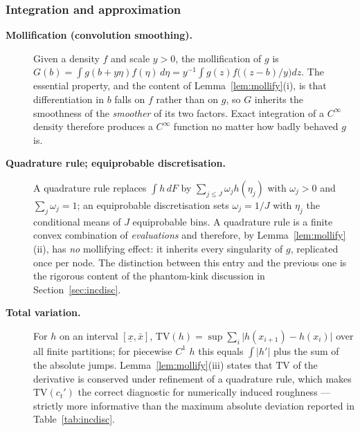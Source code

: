 \subsubsection{Integration and approximation}

\begin{description}

\item[\textnormal{\textbf{Mollification (convolution smoothing).}}]
Given a density $f$ and scale $y>0$, the mollification of $g$ is
$G(b)=\int g(b+y\eta)f(\eta)\,d\eta=y^{-1}\int g(z)f\big((z-b)/y\big)dz$. The essential
property, and the content of Lemma~\ref{lem:mollify}(i), is that differentiation in $b$
falls on $f$ rather than on $g$, so $G$ inherits the smoothness of the \emph{smoother}
of its two factors. Exact integration of a $C^{\infty}$ density therefore produces a
$C^{\infty}$ function no matter how badly behaved $g$ is.

\item[\textnormal{\textbf{Quadrature rule; equiprobable discretisation.}}]
A quadrature rule replaces $\int h\,dF$ by $\sum_{j\le J}\omega_j h(\eta_j)$ with
$\omega_j>0$ and $\sum_j\omega_j=1$; an equiprobable discretisation sets
$\omega_j=1/J$ with $\eta_j$ the conditional means of $J$ equiprobable bins. A
quadrature rule is a finite convex combination of \emph{evaluations} and therefore, by
Lemma~\ref{lem:mollify}(ii), has \emph{no} mollifying effect: it inherits every
singularity of $g$, replicated once per node. The distinction between this entry and the
previous one is the rigorous content of the phantom-kink discussion in
Section~\ref{sec:incdisc}.

\item[\textnormal{\textbf{Total variation.}}]
For $h$ on an interval $[\underline x,\bar x]$,
$\mathrm{TV}(h)=\sup\sum_{i}\lvert h(x_{i+1})-h(x_i)\rvert$ over all finite partitions;
for piecewise $C^{1}$ $h$ this equals $\int\lvert h'\rvert$ plus the sum of the absolute
jumps. Lemma~\ref{lem:mollify}(iii) states that $\mathrm{TV}$ of the derivative is
conserved under refinement of a quadrature rule, which makes $\mathrm{TV}(c_t')$ the
correct diagnostic for numerically induced roughness --- strictly more informative than
the maximum absolute deviation reported in Table~\ref{tab:incdisc}.

\end{description}

